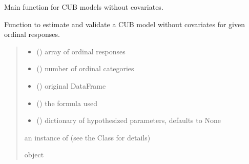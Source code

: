 \documentclass[letterpaper,10pt,english]{sphinxmanual}
\begin{document}
\begin{fulllineitems}
\label{\detokenize{cubmods:cubmods.ihg.mle}}
\pysigstartsignatures
{}
\pysigstopsignatures
\sphinxAtStartPar
Main function for CUB models without covariates.

\sphinxAtStartPar
Function to estimate and validate a CUB model without covariates for given ordinal responses.
\begin{quote}\begin{description}
\begin{itemize}
\item {} 
\sphinxAtStartPar
{} () \textendash{} array of ordinal responses

\item {} 
\sphinxAtStartPar
{} () \textendash{} number of ordinal categories

\item {} 
\sphinxAtStartPar
{} () \textendash{} original DataFrame

\item {} 
\sphinxAtStartPar
{} () \textendash{} the formula used

\item {} 
\sphinxAtStartPar
{} (\sphinxstyleliteralemphasis{\sphinxupquote{, }}) \textendash{} dictionary of hypothesized parameters, defaults to None

\end{itemize}

\sphinxAtStartPar
an instance of  (see the Class for details)

\sphinxAtStartPar
object

\end{description}\end{quote}

\end{fulllineitems}
\end{document}
